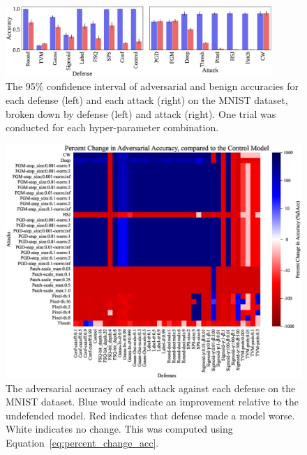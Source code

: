 \documentclass[journal]{IEEEtran}
\begin{document}
\begin{figure}[!htbp]
    {\centering
    \includegraphics[trim={0 0.85em 0 0.5em},clip,width=0.9\textwidth]{Fig17.eps}
    \vspace{-1em}
    \caption{The 95\% confidence interval of adversarial and benign accuracies for each defense (left) and each attack (right) on the MNIST dataset, broken down by defense (left) and attack (right). One trial was conducted for each hyper-parameter combination.}
    \label{fig:mnist_acc}
    } %
\end{figure}



\begin{figure}[!htbp]
    {\centering
    \includegraphics[trim={0 0.85em 0 0.35em},clip,height=0.58\textwidth]{Fig18.eps}
    \vspace{-0.5em}
    \caption{The adversarial accuracy of each attack against each defense on the MNIST dataset. Blue would indicate an improvement relative to the undefended model. Red indicates that defense made a model worse. White indicates no change. This was computed using Equation~\ref{eq:percent_change_acc}.}
    \label{fig:mnist_adv_acc_grid}
    } %
\end{figure}
\end{document}
